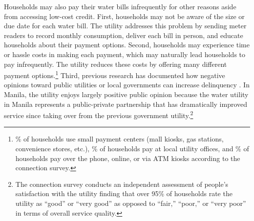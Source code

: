\documentclass[12pt,table]{article}
\begin{document}
Households may also pay their water bills infrequently for other reasons aside from accessing low-cost credit.  First, households may not be aware of the size or due date for each water bill.  The utility addresses this problem by sending meter readers to record monthly consumption, deliver each bill in person, and educate households about their payment options.  Second, households may experience time or hassle costs in making each payment, which may naturally lead households to pay infrequently.  The utility reduces these costs by offering many different payment options.\footnote{\unskip\% of households use small payment centers (mall kiosks, gas stations, convenience stores, etc.), \unskip\% of households pay at local utility offices, and \unskip\% of households pay over the phone, online, or via ATM kiosks according to the connection survey.}  Third, previous research has documented how negative opinions toward public utilities or local governments can increase delinquency \citep{szabo2015reducing}.  In Manila, the utility enjoys largely positive public opinion because the water utility in Manila represents a public-private partnership that has dramatically improved service since taking over from the previous government utility.\footnote{The connection survey conducts an independent assessment of people's satisfaction with the utility finding that over 95\% of households rate the utility as ``good'' or ``very good'' as opposed to ``fair,'' ``poor,'' or ``very poor'' in terms of overall service quality.}



\end{document}
